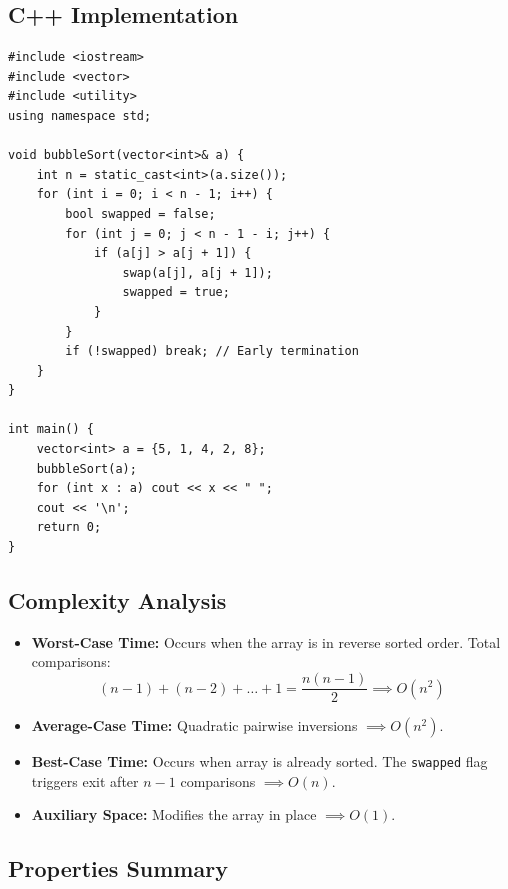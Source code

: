 \subsection{C++ Implementation}

\begin{lstlisting}[style=cppstyle, caption={C++ Optimized Bubble Sort Implementation.}]
#include <iostream>
#include <vector>
#include <utility>
using namespace std;

void bubbleSort(vector<int>& a) {
    int n = static_cast<int>(a.size());
    for (int i = 0; i < n - 1; i++) {
        bool swapped = false;
        for (int j = 0; j < n - 1 - i; j++) {
            if (a[j] > a[j + 1]) {
                swap(a[j], a[j + 1]);
                swapped = true;
            }
        }
        if (!swapped) break; // Early termination
    }
}

int main() {
    vector<int> a = {5, 1, 4, 2, 8};
    bubbleSort(a);
    for (int x : a) cout << x << " ";
    cout << '\n';
    return 0;
}
\end{lstlisting}

\subsection{Complexity Analysis}
\begin{itemize}
    \item \textbf{Worst-Case Time:} Occurs when the array is in reverse sorted order. Total comparisons:
    \[
    (n-1) + (n-2) + \dots + 1 = \frac{n(n-1)}{2} \implies \boxed{O(n^2)}
    \]
    \item \textbf{Average-Case Time:} Quadratic pairwise inversions $\implies \boxed{O(n^2)}$.
    \item \textbf{Best-Case Time:} Occurs when array is already sorted. The \texttt{swapped} flag triggers exit after $n-1$ comparisons $\implies \boxed{O(n)}$.
    \item \textbf{Auxiliary Space:} Modifies the array in place $\implies \boxed{O(1)}$.
\end{itemize}

\subsection{Properties Summary}

